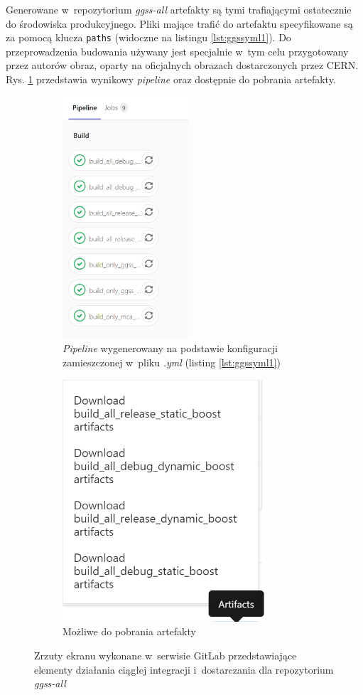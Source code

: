 Generowane w~repozytorium \textit{ggss-all} artefakty są tymi trafiającymi ostatecznie do środowiska produkcyjnego. Pliki mające trafić do artefaktu specyfikowane są za pomocą klucza \lstinline{paths} (widoczne na listingu \ref{lst:ggssyml1}). Do przeprowadzenia budowania używany jest specjalnie w~tym celu przygotowany przez autorów obraz, oparty na oficjalnych obrazach dostarczonych przez CERN. Rys. \ref{fig:pipelineall} przedstawia wynikowy \textit{pipeline} oraz dostępnie do pobrania artefakty.

\begin{figure}[H]
\centering

\begin{subfigure}{0.4\textwidth}
\centering
\includegraphics[height=9cm]{res/png/runnerPipeline}
\caption{\textit{Pipeline} wygenerowany na podstawie konfiguracji zamieszczonej w~pliku \textit{.yml} (listing \ref{lst:ggssyml1})}
\end{subfigure}
\hspace{0.5cm}
\begin{subfigure}{0.4\textwidth}
\centering
\includegraphics[height=9cm]{res/png/runnerArtifacts}
\caption{Możliwe do pobrania artefakty}
\end{subfigure}

\caption{Zrzuty ekranu wykonane w~serwisie GitLab przedstawiające elementy działania ciągłej integracji i~dostarczania dla repozytorium \textit{ggss-all}}
\label{fig:pipelineall}

\end{figure}

